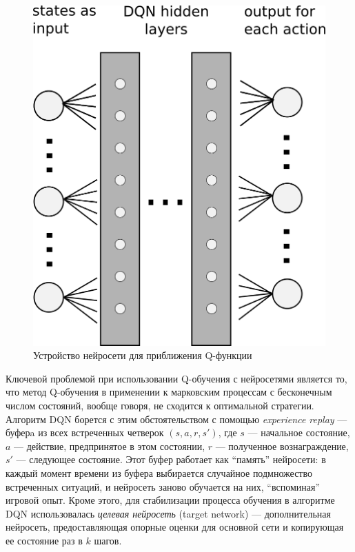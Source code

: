 \documentclass[specification, annotation]{itmo-student-thesis}
\begin{document}
\begin{figure}[!h]
  \caption{Устройство нейросети для приближения Q-функции}\label{dqn-scheme}
  \centering
  \includegraphics{dqn-scheme}
\end{figure}

Ключевой проблемой при использовании Q-обучения с нейросетями является то, что
метод Q-обучения в применении к марковским процессам с бесконечным числом
состояний, вообще говоря, не сходится к оптимальной стратегии. Алгоритм DQN
борется с этим обстоятельством с помощью \textit{experience replay} --- буферa
из всех встреченных четверок $(s, a, r, s')$, где $s$ ---
начальное состояние, $a$ --- действие, предпринятое в этом состоянии, $r$ ---
полученное вознаграждение, $s'$ --- следующее состояние. Этот буфер работает как
\enquote{память} нейросети: в каждый момент времени из буфера выбирается случайное
подмножество встреченных ситуаций, и нейросеть заново обучается на них,
\enquote{вспоминая} игровой опыт. Кроме этого, для стабилизации процесса обучения в
алгоритме DQN использовалась \textit{целевая нейросеть} (target network) ---
дополнительная нейросеть, предоставляющая опорные оценки для основной сети и
копирующая ее состояние раз в $k$ шагов.
\end{document}
